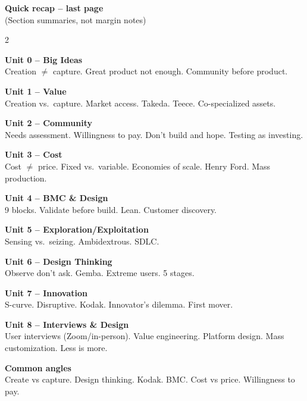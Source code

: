 \documentclass[8pt,landscape,a4paper]{article}
\begin{document}
\newpage
\vspace*{0.3em}
\begin{center}
\textbf{\color{eublue}Quick recap -- last page}\\[0.3em]
\small\textcolor{notegrey}{(Section summaries, not margin notes)}
\end{center}
\vspace{0.4em}
\noindent\color{notegrey}
\setlength{\parskip}{0.3em}
\begin{multicols}{2}

\textbf{Unit 0 -- Big Ideas}\\
Creation $\neq$ capture. Great product not enough. Community before product.

\textbf{Unit 1 -- Value}\\
Creation vs.\ capture. Market access. Takeda. Teece. Co-specialized assets.

\textbf{Unit 2 -- Community}\\
Needs assessment. Willingness to pay. Don't build and hope. Testing as investing.

\textbf{Unit 3 -- Cost}\\
Cost $\neq$ price. Fixed vs.\ variable. Economies of scale. Henry Ford. Mass production.

\textbf{Unit 4 -- BMC \& Design}\\
9 blocks. Validate before build. Lean. Customer discovery.

\textbf{Unit 5 -- Exploration/Exploitation}\\
Sensing vs.\ seizing. Ambidextrous. SDLC.

\textbf{Unit 6 -- Design Thinking}\\
Observe don't ask. Gemba. Extreme users. 5 stages.

\textbf{Unit 7 -- Innovation}\\
S-curve. Disruptive. Kodak. Innovator's dilemma. First mover.

\textbf{Unit 8 -- Interviews \& Design}\\
User interviews (Zoom/in-person). Value engineering. Platform design. Mass customization. Less is more.

\textbf{Common angles}\\
Create vs capture. Design thinking. Kodak. BMC. Cost vs price. Willingness to pay.

\end{multicols}
\vfill
\normalsize\normalfont\color{black}
\end{document}
